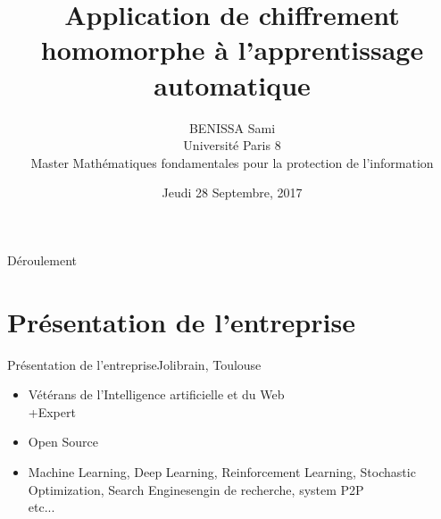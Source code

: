 \documentclass{beamer}
\title{Application de chiffrement homomorphe à l'apprentissage automatique}
\author{BENISSA Sami \\
      Université Paris 8\\
    Master Mathématiques fondamentales pour la protection de l'information}
\institute[Jolibrain, Toulouse, France] %
\date{Jeudi 28 Septembre, 2017}
\begin{document}
\begin{frame}
  \titlepage
\end{frame}
\begin{frame}{Déroulement}
  \tableofcontents
 \end{frame}

\section{Présentation de l'entreprise}


\begin{frame}{Présentation de l'entreprise}{Jolibrain, Toulouse}
\begin{itemize}
  \item {
    Vétérans de l'Intelligence artificielle et du Web\\
    +Expert
    \pause 
  }
  \item {   
    Open Source
    \pause
  }
    \item {   
      Machine Learning, Deep Learning, Reinforcement Learning, Stochastic Optimization, Search Enginesengin de recherche, system P2P \\
      etc...
    \pause
    }
\end{itemize}
\end{frame}
\end{document}
